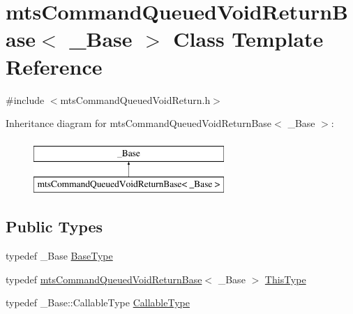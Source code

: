 \hypertarget{classmts_command_queued_void_return_base}{}\section{mts\+Command\+Queued\+Void\+Return\+Base$<$ \+\_\+\+Base $>$ Class Template Reference}
\label{classmts_command_queued_void_return_base}


{\ttfamily \#include $<$mts\+Command\+Queued\+Void\+Return.\+h$>$}

Inheritance diagram for mts\+Command\+Queued\+Void\+Return\+Base$<$ \+\_\+\+Base $>$\+:\begin{figure}[H]
\begin{center}
\leavevmode
\includegraphics[height=2.000000cm]{d4/d6e/classmts_command_queued_void_return_base}
\end{center}
\end{figure}
\subsection*{Public Types}
\begin{DoxyCompactItemize}
\item 
typedef \+\_\+\+Base \hyperlink{classmts_command_queued_void_return_base_a29c68cf6ce656cb59012c2e8086c8f8d}{Base\+Type}
\item 
typedef \hyperlink{classmts_command_queued_void_return_base}{mts\+Command\+Queued\+Void\+Return\+Base}$<$ \+\_\+\+Base $>$ \hyperlink{classmts_command_queued_void_return_base_a336bb46e1c968dc3003f9dc163c9f82c}{This\+Type}
\item 
typedef \+\_\+\+Base\+::\+Callable\+Type \hyperlink{classmts_command_queued_void_return_base_a66e6a106a0c17625d9f0ec9a33ff634a}{Callable\+Type}
\end{DoxyCompactItemize}
